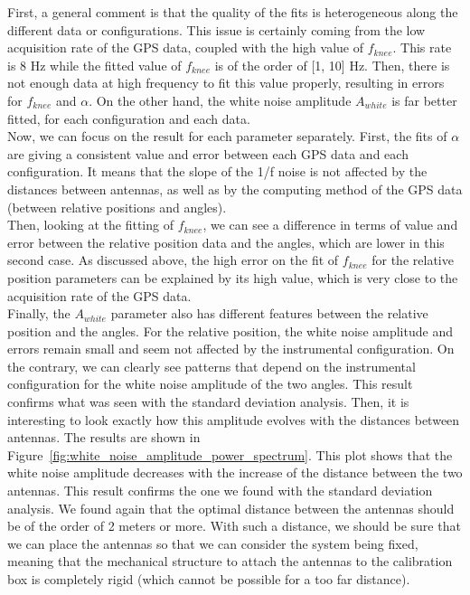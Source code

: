 \documentclass[../../thesis.tex]{subfiles}
\begin{document}
First, a general comment is that the quality of the fits is heterogeneous along the different data or configurations. This issue is certainly coming from the low acquisition rate of the GPS data, coupled with the high value of $f_{knee}$. This rate is 8 Hz while the fitted value of $f_{knee}$ is of the order of [1, 10] Hz. Then, there is not enough data at high frequency to fit this value properly, resulting in errors for $f_{knee}$ and $\alpha$. On the other hand, the white noise amplitude $A_{white}$ is far better fitted, for each configuration and each data. \\
Now, we can focus on the result for each parameter separately. First, the fits of $\alpha$ are giving a consistent value and error between each GPS data and each configuration. It means that the slope of the 1/f noise is not affected by the distances between antennas, as well as by the computing method of the GPS data (between relative positions and angles). \\
Then, looking at the fitting of $f_{knee}$, we can see a difference in terms of value and error between the relative position data and the angles, which are lower in this second case. As discussed above, the high error on the fit of $f_{knee}$ for the relative position parameters can be explained by its high value, which is very close to the acquisition rate of the GPS data. \\
Finally, the $A_{white}$ parameter also has different features between the relative position and the angles. For the relative position, the white noise amplitude and errors remain small and seem not affected by the instrumental configuration. On the contrary, we can clearly see patterns that depend on the instrumental configuration for the white noise amplitude of the two angles. This result confirms what was seen with the standard deviation analysis. Then, it is interesting to look exactly how this amplitude evolves with the distances between antennas. The results are shown in Figure~\ref{fig:white_noise_amplitude_power_spectrum}. This plot shows that the white noise amplitude decreases with the increase of the distance between the two antennas. This result confirms the one we found with the standard deviation analysis. We found again that the optimal distance between the antennas should be of the order of 2 meters or more. With such a distance, we should be sure that we can place the antennas so that we can consider the system being fixed, meaning that the mechanical structure to attach the antennas to the calibration box is completely rigid (which cannot be possible for a too far distance).
\end{document}

